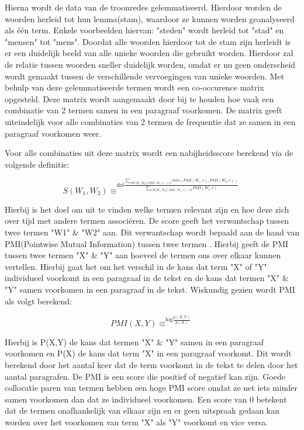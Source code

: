 Hierna wordt de data van de troonredes gelemmatiseerd. Hierdoor worden de woorden herleid tot hun lemma(stam), waardoor ze kunnen worden geanalyseerd als één term. Enkele voorbeelden hiervan: "steden" wordt herleid tot "stad" en "mensen" tot "mens". Doordat alle woorden hierdoor tot de stam zijn herleidt is er een duidelijk beeld van alle unieke woorden die gebruikt worden. Hierdoor zal de relatie tussen woorden sneller duidelijk worden, omdat er nu geen onderscheid wordt gemaakt tussen de verschillende vervoegingen van unieke woorden. Met behulp van deze gelemmatiseerde termen wordt een co-occurence matrix opgesteld. Deze matrix wordt aangemaakt door bij te houden hoe vaak een combinatie van 2 termen samen in een paragraaf voorkomen. De matrix geeft uiteindelijk voor alle combinaties van 2 termen de frequentie dat ze samen in een paragraaf voorkomen weer.

Voor alle combinaties uit deze matrix wordt een nabijheidsscore berekend via de volgende definitie: 

 $$S(W_1,W_2)\equiv^{\mathrm{def}\frac{\sum_{c\epsilon W\setminus{W_1,W_2\},PMI(W_1,c)>0}}min(PMI(W_1,c),PMI(W_2,c))}{\sum_{c\epsilon W\{W_1,W_2\},PMI(W_1,c)>0}PMI(W_1,c)}}$$ 

Hierbij is het doel om uit te vinden welke termen relevant zijn en hoe deze zich over tijd met andere termen associëren. De score geeft het verwantschap tussen twee termen "W1" \& "W2" aan. Dit verwantschap wordt bepaald aan de hand van PMI(Pointwise Mutual Information) tussen twee termen \citep{bouma2009normalized}. Hierbij geeft de PMI tussen twee termen "X" \& "Y" aan hoeveel de termen ons over elkaar kunnen vertellen. Hierbij gaat het om het verschil in de kans dat term "X" of "Y" individueel voorkomt in een paragraaf in de tekst en de kans dat termen "X" \& "Y" samen voorkomen in een paragraaf in de tekst. Wiskundig gezien wordt PMI als volgt berekend: 

$$PMI(X,Y)\equiv^{\mathrm{log}\frac{p(X,Y)}{p(X)}}$$

Hierbij is P(X,Y) de kans dat termen "X" \& "Y" samen in een paragraaf voorkomen en P(X) de kans dat term "X" in een paragraaf voorkomt. Dit wordt berekend door het aantal keer dat de term voorkomt in de tekst te delen door het aantal paragrafen. De PMI is een score die positief of negatief kan zijn. Goede collocatie paren van termen hebben een hoge PMI score omdat ze net iets minder samen voorkomen dan dat ze individueel voorkomen.  Een score van 0 betekent dat de termen onafhankelijk van elkaar zijn en er geen uitspraak gedaan kan worden over het voorkomen van term "X" als "Y" voorkomt en vice versa.

